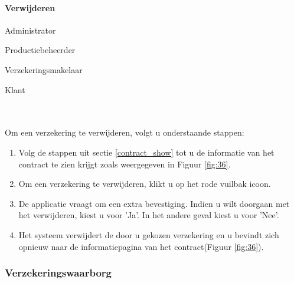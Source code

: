\documentclass[11pt,openany]{article}
\newcommand{\cmark}{\ding{51}}%
\newcommand{\xmark}{\ding{55}}%
\newcommand{\done}{\rlap{$\square$}{\raisebox{2pt}{\large\hspace{1pt}\cmark}}%
	\hspace{-2.5pt}}
\newcommand{\wontfix}{\rlap{$\square$}{\large\hspace{1pt}\xmark}}
\begin{document}
\paragraph{Verwijderen}
\begin{todolist}
	\item[\done] Administrator
	\item[\done] Productiebeheerder
	\item[\done] Verzekeringsmakelaar
	\item[\wontfix] Klant 
\end{todolist}
\\
\\
Om een verzekering te verwijderen, volgt u onderstaande stappen:
\begin{enumerate}
		\item  Volg de stappen uit sectie \ref{contract_show} tot u de informatie van het contract te zien krijgt zoals weergegeven in Figuur \ref{fig:36}.
	\item Om een verzekering te verwijderen, klikt u op het rode vuilbak icoon.
	\item De applicatie vraagt om een extra bevestiging. Indien u wilt doorgaan met het verwijderen, kiest u voor 'Ja'. In het andere geval kiest u voor 'Nee'.
	\item Het systeem verwijdert de door u gekozen verzekering en u bevindt zich opnieuw naar de informatiepagina van het contract(Figuur \ref{fig:36}).
\end{enumerate}

\subsubsection{Verzekeringswaarborg}
\label{sureties}
\end{document}
